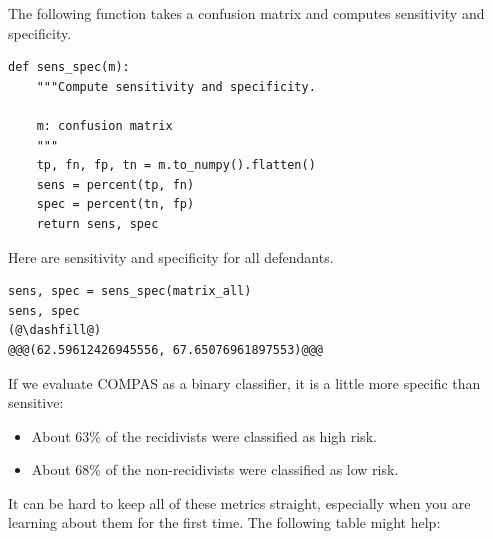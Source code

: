 The following function takes a confusion matrix and computes sensitivity
and specificity.

\begin{lstlisting}[]
def sens_spec(m):
    """Compute sensitivity and specificity.
    
    m: confusion matrix
    """
    tp, fn, fp, tn = m.to_numpy().flatten()
    sens = percent(tp, fn)
    spec = percent(tn, fp)
    return sens, spec
\end{lstlisting}

Here are sensitivity and specificity for all defendants.

\begin{lstlisting}[]
sens, spec = sens_spec(matrix_all)
sens, spec
(@\dashfill@)
@@@(62.59612426945556, 67.65076961897553)@@@
\end{lstlisting}

If we evaluate COMPAS as a binary classifier, it is a little more
specific than sensitive:

\begin{itemize}
\item
  About 63\% of the recidivists were classified as high risk.
\item
  About 68\% of the non-recidivists were classified as low risk.
\end{itemize}

It can be hard to keep all of these metrics straight, especially when
you are learning about them for the first time. The following table
might help:

